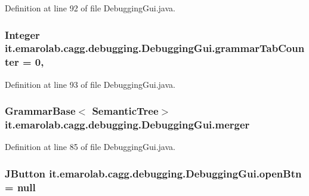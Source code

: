 Definition at line 92 of file Debugging\-Gui.\-java.

\hypertarget{classit_1_1emarolab_1_1cagg_1_1debugging_1_1DebuggingGui_adfd9bc3e068ae7cde1f2d521f54110e0}{
\subsubsection[{grammar\-Tab\-Counter}]{\setlength{\rightskip}{0pt plus 5cm}Integer it.\-emarolab.\-cagg.\-debugging.\-Debugging\-Gui.\-grammar\-Tab\-Counter = 0\hspace{0.3cm}{\ttfamily [static]}, {\ttfamily [private]}}}\label{classit_1_1emarolab_1_1cagg_1_1debugging_1_1DebuggingGui_adfd9bc3e068ae7cde1f2d521f54110e0}


Definition at line 93 of file Debugging\-Gui.\-java.

\hypertarget{classit_1_1emarolab_1_1cagg_1_1debugging_1_1DebuggingGui_a03d18ffb6d8ab6c84ad429c8dac4b886}{
\subsubsection[{merger}]{\setlength{\rightskip}{0pt plus 5cm}Grammar\-Base$<$ {\bf Semantic\-Tree}$>$ it.\-emarolab.\-cagg.\-debugging.\-Debugging\-Gui.\-merger\hspace{0.3cm}{\ttfamily [private]}}}\label{classit_1_1emarolab_1_1cagg_1_1debugging_1_1DebuggingGui_a03d18ffb6d8ab6c84ad429c8dac4b886}


Definition at line 85 of file Debugging\-Gui.\-java.

\hypertarget{classit_1_1emarolab_1_1cagg_1_1debugging_1_1DebuggingGui_a41c02534a8378f4c96b9a7135586ea63}{
\subsubsection[{open\-Btn}]{\setlength{\rightskip}{0pt plus 5cm}J\-Button it.\-emarolab.\-cagg.\-debugging.\-Debugging\-Gui.\-open\-Btn = null\hspace{0.3cm}{\ttfamily [private]}}}\label{classit_1_1emarolab_1_1cagg_1_1debugging_1_1DebuggingGui_a41c02534a8378f4c96b9a7135586ea63}


